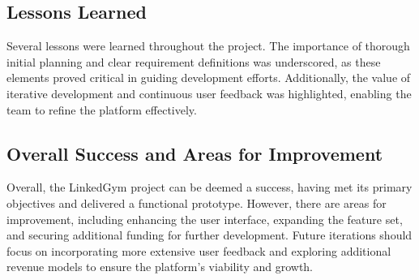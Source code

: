 \subsection{Lessons Learned}
Several lessons were learned throughout the project. The importance of thorough initial planning and clear requirement definitions was underscored, as these elements proved critical in guiding development efforts. Additionally, the value of iterative development and continuous user feedback was highlighted, enabling the team to refine the platform effectively.

\subsection{Overall Success and Areas for Improvement}
Overall, the LinkedGym project can be deemed a success, having met its primary objectives and delivered a functional prototype. However, there are areas for improvement, including enhancing the user interface, expanding the feature set, and securing additional funding for further development. Future iterations should focus on incorporating more extensive user feedback and exploring additional revenue models to ensure the platform's viability and growth.

\clearpage